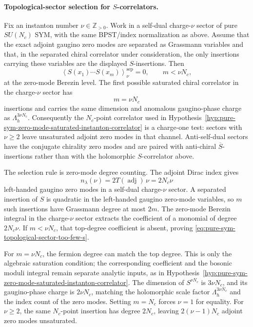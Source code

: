 \paragraph{Topological-sector selection for \(S\)-correlators.}
Fix an instanton number \(\nu\in\mathbb Z_{>0}\).  Work in a self-dual
charge-\(\nu\) sector of pure \(SU(N_c)\) SYM, with the same BPST/index
normalization as above.  Assume that the exact adjoint gaugino zero modes are
separated as Grassmann variables and that, in the separated chiral correlator
under consideration, the only insertions carrying these variables are the
displayed \(S\)-insertions.  Then
\begin{equation}
  \left\langle S(x_1)\cdots S(x_m)\right\rangle_{\nu}^{\mathrm{sep}}=0,
  \qquad m<\nu N_c,
  \label{eq:pure-sym-topological-sector-too-few-s}
\end{equation}
at the zero-mode Berezin level.  The first possible saturated chiral
correlator in the charge-\(\nu\) sector has
\[
  m=\nu N_c
\]
insertions and carries the same dimension and anomalous gaugino-phase charge
as \(\Lambda_h^{3\nu N_c}\).  Consequently the \(N_c\)-point correlator used
in Hypothesis~\ref{hyp:pure-sym-zero-mode-saturated-instanton-correlator} is
a charge-one test: sectors with \(\nu\geq2\) leave unsaturated adjoint zero
modes in that channel.  Anti-self-dual sectors have the conjugate chirality
zero modes and are paired with anti-chiral \(\overline S\)-insertions rather
than with the holomorphic \(S\)-correlator above.

The selection rule is zero-mode degree counting.
The adjoint Dirac index gives
\[
  n_\lambda(\nu)=2T(\operatorname{adj})\,\nu=2N_c\nu
\]
left-handed gaugino zero modes in a self-dual charge-\(\nu\) sector.  A
separated insertion of \(S\) is quadratic in the left-handed gaugino
zero-mode variables, so \(m\) such insertions have Grassmann degree at most
\(2m\).  The zero-mode Berezin integral in the charge-\(\nu\) sector extracts
the coefficient of a monomial of degree \(2N_c\nu\).  If \(m<\nu N_c\), that
top-degree coefficient is absent, proving
\eqref{eq:pure-sym-topological-sector-too-few-s}.

For \(m=\nu N_c\), the fermion degree can match the top degree.  This is only
the algebraic saturation condition; the corresponding coefficient and the
bosonic moduli integral remain separate analytic inputs, as in
Hypothesis~\ref{hyp:pure-sym-zero-mode-saturated-instanton-correlator}.  The
dimension of \(S^{\nu N_c}\) is \(3\nu N_c\), and its gaugino-phase charge is
\(2\nu N_c\), matching the holomorphic scale factor
\(\Lambda_h^{3\nu N_c}\) and the index count of the zero modes.  Setting
\(m=N_c\) forces \(\nu=1\) for equality.  For \(\nu\geq2\), the same
\(N_c\)-point insertion has degree \(2N_c\), leaving
\(2(\nu-1)N_c\) adjoint zero modes unsaturated.

